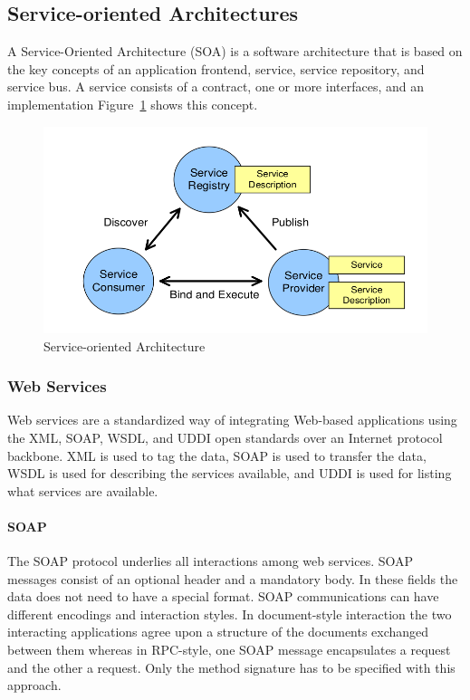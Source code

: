 \subsection{Service-oriented Architectures}
A Service-Oriented Architecture (SOA) is a software architecture that is based on the key concepts of an application frontend, service, service repository, and service bus.
A service consists of a contract, one or more interfaces, and an implementation
Figure~\ref{fig:service_oriented_architecture} shows this concept.
\begin{figure}[h]
  \centering
  \includegraphics[width=.8\textwidth]{images/service_oriented_architecture.png}
  \caption{Service-oriented Architecture}\label{fig:service_oriented_architecture}
\end{figure}

\subsubsection{Web Services}
Web services are a standardized way of integrating Web-based applications using the XML, SOAP, WSDL, and UDDI open standards over an Internet protocol backbone.
XML is used to tag the data, SOAP is used to transfer the data, WSDL is used for describing the services available, and UDDI is used for listing what services are available.

\paragraph{SOAP}
The SOAP protocol underlies all interactions among web services.
SOAP messages consist of an optional header and a mandatory body.
In these fields the data does not need to have a special format.
SOAP communications can have different encodings and interaction styles.
In document-style interaction the two interacting applications agree upon a structure of the documents exchanged between them whereas in RPC-style, one SOAP message encapsulates a request and the other a request.
Only the method signature has to be specified with this approach.

